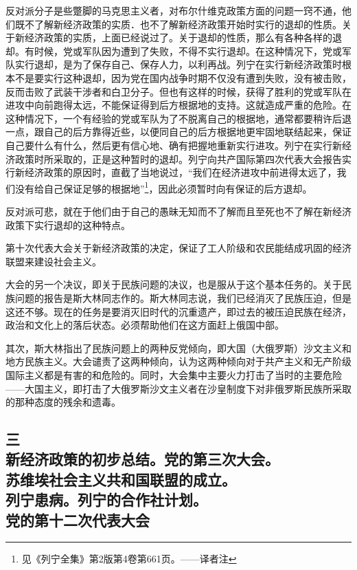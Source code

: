 反对派分子是些蹩脚的马克思主义者，对布尔什维克政策方面的问题一窍不通，他们既不了解新经济政策的实质．也不了解新经济政策开始时实行的退却的性质。关于新经济政策的实质，上面已经说过了。关于退却的性质，那么有各种各样的退却。有时候，党或军队因为遭到了失败，不得不实行退却。在这种情况下，党或军队实行退却，是为了保存自己、保存人力，以利再战。列宁在实行新经济政策时根本不是要实行这种退却，因为党在国内战争时期不仅没有遭到失败，没有被击败，反而击败了武装干涉者和白卫分子。但也有这样的时候，获得了胜利的党或军队在进攻中向前跑得太远，不能保证得到后方根据地的支持。这就造成严重的危险。在这种情况下，一个有经验的党或军队为了不脱离自己的根据地，通常都要稍许后退一点，跟自己的后方靠得近些，以便同自己的后方根据地更牢固地联结起来，保证自己要什么有什么，然后更有信心地、确有把握地重新实行进攻。列宁在实行新经济政策时所采取的，正是这种暂时的退却。列宁向共产国际第四次代表大会报告实行新经济政策的原因时，直截了当地说过，“我们在经济进攻中前进得太远了，我们没有给自己保证足够的根据地”\footnote{见《列宁全集》第2版第4卷第661页。——译者注}，因此必须暂时向有保证的后方退却。

反对派可悲，就在于他们由于自己的愚昧无知而不了解而且至死也不了解在新经济政策下实行退却的这种特点。

第十次代表大会关于新经济政策的决定，保证了工人阶级和农民能结成巩固的经济联盟来建设社会主义。

大会的另一个决议，即关于民族问题的决议，也是服从于这个基本任务的。关于民族问题的报告是斯大林同志作的。斯大林同志说，我们已经消灭了民族压迫，但是这还不够。现在的任务是要消灭旧时代的沉重遗产，即过去的被压迫民族在经济，政治和文化上的落后状态。必须帮助他们在这方面赶上俄国中部。

其次，斯大林指出了民族问题上的两种反党倾向，即大国（大俄罗斯）沙文主义和地方民族主义。大会谴责了这两种倾向，认为这两种倾向对于共产主义和无产阶级国际主义都是有害的和危险的。同时，大会集中主要火力打击了当时的主要危险——大国主义，即打击了大俄罗斯沙文主义者在沙皇制度下对非俄罗斯民族所采取的那种态度的残余和遗毒。


\subsection[三\q 新经济政策的初步总结。党的第三次大会。苏维埃社会主义共和国联盟的成立。列宁患病。列宁的合作社计划。党的第十二次代表大会]{三\\新经济政策的初步总结。党的第三次大会。\\苏维埃社会主义共和国联盟的成立。\\列宁患病。列宁的合作社计划。\\党的第十二次代表大会}


